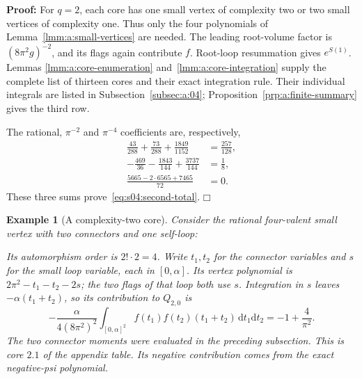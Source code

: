 \documentclass[a4paper,10pt]{article}
\numberwithin{equation}{section}
\newcommand{\dd}{\mathrm{d}}
\theoremstyle{paperplain}
\theoremstyle{paperremark}
\newtheorem{exm}{Example}[section]
\theoremstyle{paperplain}
\newenvironment{prf}{\noindent \textbf{Proof: }}{\hfill $\mdlgwhtsquare$\par\addvspace{0.5\baselineskip}}
\begin{document}
\begin{prf}
For $q=2$, each core has one small vertex of complexity two or two
small vertices of complexity one. Thus only the four polynomials of
Lemma~\ref{lmm:a:small-vertices} are needed. The leading root-volume
factor is $(8\pi^2g)^{-2}$, and its flags again contribute $f$.
Root-loop resummation gives $e^{S(1)}$. Lemmas
\ref{lmm:a:core-enumeration} and~\ref{lmm:a:core-integration} supply
the complete list of thirteen cores and their exact integration rule.
Their individual integrals are listed in Subsection~\ref{subsec:a:04};
Proposition~\ref{prp:a:finite-summary} gives the third row.

The rational, $\pi^{-2}$ and $\pi^{-4}$ coefficients are, respectively,
\begin{align*}
 \frac{43}{288}+\frac{73}{288}+\frac{1849}{1152}
   &=\frac{257}{128},\\
 -\frac{469}{36}-\frac{1843}{144}+\frac{3737}{144}
   &=\frac18,\\
 \frac{5665-2\cdot6565+7465}{72}&=0.
\end{align*}
These three sums prove~\eqref{eq:s04:second-total}.
\end{prf}

\begin{exm}[A complexity-two core]
Consider the rational four-valent small vertex with two connectors
and one self-loop:
\begin{center}
\end{center}
Its automorphism order is $2!\cdot2=4$. Write $t_1,t_2$ for the
connector variables and $s$ for the small loop variable, each in
$[0,\alpha]$. Its vertex polynomial is
$2\pi^2-t_1-t_2-2s$; the two flags of that loop both use $s$.
Integration in $s$ leaves $-\alpha(t_1+t_2)$, so its contribution
to $Q_{2,0}$ is
\begin{equation}\label{eq:s04:q-two-example}
 -\frac{\alpha}{4(8\pi^2)^2}\int_{[0,\alpha]^2}
 f(t_1)f(t_2)(t_1+t_2)\,\dd t_1\dd t_2
 =-1+\frac4{\pi^2}.
\end{equation}
The two connector moments were evaluated in the preceding subsection.
This is core $2.1$ of the appendix table. Its negative contribution
comes from the exact negative-psi polynomial.
\end{exm}
\end{document}
